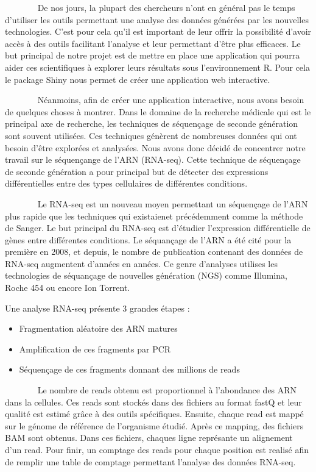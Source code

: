 \documentclass[
  12pt,
]{article}
\begin{document}
~~~~~~~ De nos jours, la plupart des chercheurs n'ont en général pas le
temps d'utiliser les outils permettant une analyse des données générées
par les nouvelles technologies. C'est pour cela qu'il est important de
leur offrir la possibilité d'avoir accès à des outils facilitant
l'analyse et leur permettant d'être plus efficaces. Le but principal de
notre projet est de mettre en place une application qui pourra aider ces
scientifiques à explorer leurs résultats sous l'environnement R. Pour
cela le package Shiny nous permet de créer une application web
interactive.

\par

~~~~~~~ Néanmoins, afin de créer une application interactive, nous avons
besoin de quelques choses à montrer. Dans le domaine de la recherche
médicale qui est le principal axe de recherche, les techniques de
séquençage de seconde génération sont souvent utilisées. Ces techniques
génèrent de nombreuses données qui ont besoin d'être explorées et
analysées. Nous avons donc décidé de concentrer notre travail sur le
séquençange de l'ARN (RNA-seq). Cette technique de séquençage de seconde
génération a pour principal but de détecter des expressions
différentielles entre des types cellulaires de différentes conditions.

~~~~~~~ Le RNA-seq est un nouveau moyen permettant un séquençage de
l'ARN plus rapide que les techniques qui existaienet précédemment comme
la méthode de Sanger. Le but principal du RNA-seq est d'étudier
l'expression différentielle de gènes entre différentes conditions. Le
séquançage de l'ARN a été cité pour la première en 2008, et depuis, le
nombre de publication contenant des données de RNA-seq augmentent
d'années en années. Ce genre d'analyses utilises les technologies de
séquançage de nouvelles génération (NGS) comme Illumina, Roche 454 ou
encore Ion Torrent.

Une analyse RNA-seq présente 3 grandes étapes :

\begin{itemize}
\item Fragmentation aléatoire des ARN matures 
\item Amplification de ces fragments par PCR
\item Séquençage de ces fragments donnant des millions de reads
\end{itemize}

~~~~~~~ Le nombre de reads obtenu est proportionnel à l'abondance des
ARN dans la cellules. Ces reads sont stockés dans des fichiers au format
fastQ et leur qualité est estimé grâce à des outils spécifiques.
Ensuite, chaque read est mappé sur le génome de référence de l'organisme
étudié. Après ce mapping, des fichiers BAM sont obtenus. Dans ces
fichiers, chaques ligne représante un alignement d'un read. Pour finir,
un comptage des reads pour chaque position est realisé afin de remplir
une table de comptage permettant l'analyse des données RNA-seq.
\end{document}
